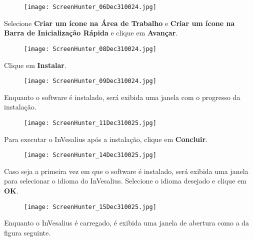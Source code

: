 \begin{figure}[!htb]
\centering
\texttt{[image: ScreenHunter\_06Dec310024.jpg]}
\end{figure}

\hspace{.2cm}

Selecione \textbf{Criar um ícone na Área de Trabalho} e \textbf{Criar um ícone
na Barra de Inicialização Rápida} e clique em \textbf{Avançar}.

\begin{figure}[!htb]
\centering
\texttt{[image: ScreenHunter\_08Dec310024.jpg]}
\end{figure}

\newpage

Clique em \textbf{Instalar}.

\begin{figure}[!htb]
\centering
\texttt{[image: ScreenHunter\_09Dec310024.jpg]}
\end{figure}

\hspace{.2cm}

Enquanto o software é instalado, será exibida uma janela com o progresso
da instalação.

\begin{figure}[!htb]
\centering
\texttt{[image: ScreenHunter\_11Dec310025.jpg]}
\end{figure}

\newpage

Para executar o InVesalius após a instalação, clique em \textbf{Concluir}.

\begin{figure}[!htb]
\centering
\texttt{[image: ScreenHunter\_14Dec310025.jpg]}
\end{figure}

\hspace{.2cm}

Caso seja a primeira vez em que o software é instalado, será exibida uma janela
para selecionar o idioma do InVesalius. Selecione o idioma desejado e clique em
\textbf{OK}.

\begin{figure}[!htb]
\centering
\texttt{[image: ScreenHunter\_15Dec310025.jpg]}
\end{figure}

\newpage

Enquanto o InVesalius é carregado, é exibida uma janela de abertura como a da figura
seguinte.

